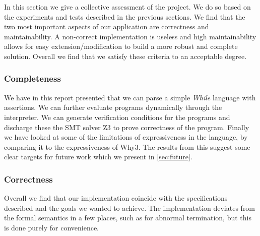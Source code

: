 In this section we give a collective assessment of the project. We do so based on the experiments and tests described in the previous sections.
We find that the two most important aspects of our application are correctness and maintainability. A non-correct implementation is useless and high maintainability allows for easy extension/modification to build a more robust and complete solution.
Overall we find that we satisfy these criteria to an acceptable degree.

\subsubsection{Completeness}
We have in this report presented that we can parse a simple \textit{While} language with assertions. We can further evaluate programs dynamically through the interpreter. We can generate verification conditions for the programs and discharge these the SMT solver Z3 to prove correctness of the program.
Finally we have looked at some of the limitations of expressiveness in the language, by comparing it to the expressiveness of Why3. The results from this suggest some clear targets for future work which we present in \cref{sec:future}.

\subsubsection{Correctness}
Overall we find that our implementation coincide with the specifications described and the goals we wanted to achieve.
The implementation deviates from the formal semantics in a few places, such as for abnormal termination, but this is done purely for convenience.

